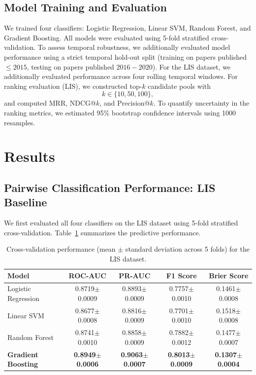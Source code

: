 \documentclass[11pt,a4paper]{article}
\begin{document}
\subsection{Model Training and Evaluation}

We trained four classifiers: Logistic Regression, Linear SVM, Random Forest, and Gradient Boosting. All models were evaluated using 5-fold stratified cross-validation. To assess temporal robustness, we additionally evaluated model performance using a strict temporal hold-out split (training on papers published $\le 2015$, testing on papers published $2016-2020$). For the LIS dataset, we additionally evaluated performance across four rolling temporal windows. For ranking evaluation (LIS), we constructed top-\(k\) candidate pools with
\[
k \in \{10,50,100\},
\]
and computed MRR, NDCG@\(k\), and Precision@\(k\). To quantify uncertainty in the ranking metrics, we estimated 95\% bootstrap confidence intervals using 1000 resamples.

\section{Results}
\label{sec:results}

\subsection{Pairwise Classification Performance: LIS Baseline}

We first evaluated all four classifiers on the LIS dataset using 5-fold stratified cross-validation. Table~\ref{tab:cv} summarizes the predictive performance.

\begin{table}[H]
\centering
\caption{Cross-validation performance (mean $\pm$ standard deviation across 5 folds) for the LIS dataset.}
\label{tab:cv}
\begin{tabular}{lcccc}
\toprule
\textbf{Model} & \textbf{ROC-AUC} & \textbf{PR-AUC} & \textbf{F1 Score} & \textbf{Brier Score} \\
\midrule
Logistic Regression & 0.8719$\pm$0.0009 & 0.8893$\pm$0.0009 & 0.7757$\pm$0.0010 & 0.1461$\pm$0.0008 \\
Linear SVM & 0.8677$\pm$0.0008 & 0.8816$\pm$0.0009 & 0.7701$\pm$0.0010 & 0.1518$\pm$0.0008 \\
Random Forest & 0.8741$\pm$0.0010 & 0.8858$\pm$0.0009 & 0.7882$\pm$0.0012 & 0.1477$\pm$0.0007 \\
\textbf{Gradient Boosting} & \textbf{0.8949$\pm$0.0006} & \textbf{0.9063$\pm$0.0007} & \textbf{0.8013$\pm$0.0009} & \textbf{0.1307$\pm$0.0004} \\
\bottomrule
\end{tabular}
\end{table}
\end{document}
